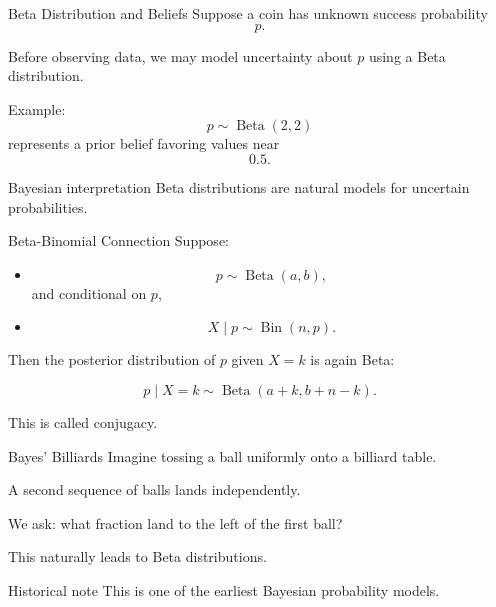\begin{frame}{Beta Distribution and Beliefs}
Suppose a coin has unknown success probability
\[
p.
\]

Before observing data, we may model uncertainty about $p$ using a Beta distribution.

\vspace{0.25cm}

Example:
\[
p\sim \operatorname{Beta}(2,2)
\]
represents a prior belief favoring values near
\[
0.5.
\]

\vspace{0.25cm}

\begin{keybox}{Bayesian interpretation}
Beta distributions are natural models for uncertain probabilities.
\end{keybox}
\end{frame}

\begin{frame}{Beta-Binomial Connection}
Suppose:
\begin{itemize}
    \item
    \[
    p\sim \operatorname{Beta}(a,b),
    \]
    and conditional on $p$,

    \item
    \[
    X\mid p\sim \operatorname{Bin}(n,p).
    \]
\end{itemize}

Then the posterior distribution of $p$ given $X=k$ is again Beta:

\[
\boxed{
p\mid X=k
\sim
\operatorname{Beta}(a+k,b+n-k).
}
\]

\vspace{0.25cm}

This is called conjugacy.
\end{frame}

\begin{frame}{Bayes' Billiards}
Imagine tossing a ball uniformly onto a billiard table.

A second sequence of balls lands independently.

\vspace{0.25cm}

We ask:
what fraction land to the left of the first ball?

\vspace{0.25cm}

This naturally leads to Beta distributions.

\vspace{0.25cm}

\begin{keybox}{Historical note}
This is one of the earliest Bayesian probability models.
\end{keybox}
\end{frame}

